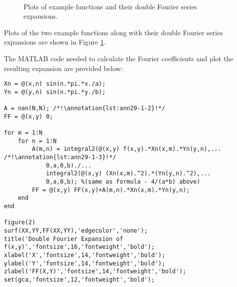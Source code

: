\begin{figure}[h!]
 \\
\label{fig:lec29-dfexp}
\caption{Plots of example functions and their double Fourier series expansions.}
\end{figure}
\noindent Plots of the two example functions along with their double Fourier series expansions are shown in Figure \ref{fig:lec29-dfexp}. 

\vspace{2.0cm}

\noindent The MATLAB code needed to calculate the Fourier coefficients and plot the resulting expansion are provided below:

\begin{lstlisting}[name=lec29-ex1,style=myMatlab]
%% Double Fourier Expansion
Xn = @(x,n) sin(n.*pi.*x./a);
Yn = @(y,n) sin(n.*pi.*y./b);

A = nan(N,N); /*!\annotation{lst:ann29-1-2}!*/
FF = @(x,y) 0;

for m = 1:N
    for n = 1:N
        A(m,n) = integral2(@(x,y) f(x,y).*Xn(x,m).*Yn(y,n),... /*!\annotation{lst:ann29-1-3}!*/
            0,a,0,b)./...
            integral2(@(x,y) (Xn(x,m).^2).*(Yn(y,n).^2),...
            0,a,0,b); %(same as formula - 4/(a*b) above)
        FF = @(x,y) FF(x,y)+A(m,n).*Xn(x,m).*Yn(y,n);
    end
end

figure(2)
surf(XX,YY,FF(XX,YY),'edgecolor','none');
title('Double Fourier Expansion of f(x,y)','fontsize',16,'fontweight','bold');
xlabel('X','fontsize',14,'fontweight','bold');
ylabel('Y','fontsize',14,'fontweight','bold');
zlabel('FF(X,Y)','fontsize',14,'fontweight','bold');
set(gca,'fontsize',12,'fontweight','bold');
\end{lstlisting}



